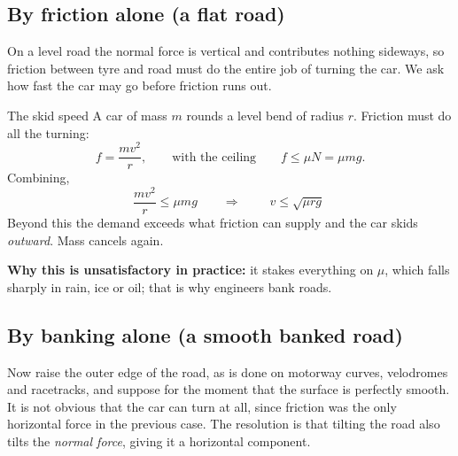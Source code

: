 \begin{figure}[htbp]
\centering
{}
\end{figure}

\subsection{By friction alone (a flat road)}
On a level road the normal force is vertical and contributes nothing sideways, so friction between tyre
and road must do the entire job of turning the car. We ask how fast the car may go before friction runs
out.

\begin{derivbox}{The skid speed}
A car of mass $m$ rounds a level bend of radius $r$. Friction must do all the turning:
\[
f=\frac{mv^{2}}{r},
\qquad\text{with the ceiling}\qquad
f\le\mu N=\mu mg.
\]
Combining,
\[
\frac{mv^{2}}{r}\le\mu mg
\qquad\Longrightarrow\qquad
\boxed{\;v\le\sqrt{\mu rg}\;}
\]
Beyond this the demand exceeds what friction can supply and the car skids \emph{outward}. Mass cancels
again.

\smallskip
\textbf{Why this is unsatisfactory in practice:} it stakes everything on $\mu$, which falls sharply in
rain, ice or oil; that is why engineers bank roads.
\end{derivbox}

\subsection{By banking alone (a smooth banked road)}
Now raise the outer edge of the road, as is done on motorway curves, velodromes and racetracks, and
suppose for the moment that the surface is perfectly smooth. It is not obvious that the car can turn at
all, since friction was the only horizontal force in the previous case. The resolution is that tilting
the road also tilts the \emph{normal force}, giving it a horizontal component.

